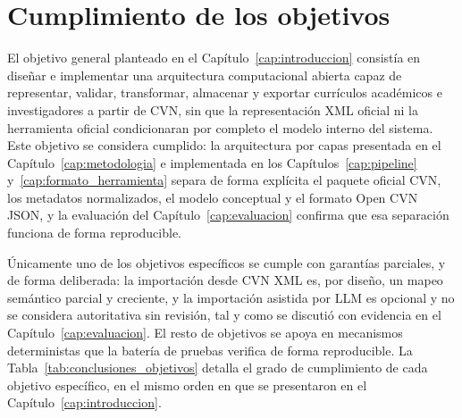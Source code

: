 \section{Cumplimiento de los objetivos}
\label{sec:conclusiones_objetivos}

El objetivo general planteado en el Capítulo~\ref{cap:introduccion} consistía
en diseñar e implementar una arquitectura computacional abierta capaz de
representar, validar, transformar, almacenar y exportar currículos
académicos e investigadores a partir de CVN, sin que la representación XML
oficial ni la herramienta oficial condicionaran por completo el modelo
interno del sistema. Este objetivo se considera cumplido: la arquitectura
por capas presentada en el Capítulo~\ref{cap:metodologia} e implementada en
los Capítulos~\ref{cap:pipeline} y~\ref{cap:formato_herramienta} separa de
forma explícita el paquete oficial CVN, los metadatos normalizados, el
modelo conceptual y el formato Open CVN JSON, y la evaluación del
Capítulo~\ref{cap:evaluacion} confirma que esa separación funciona de forma
reproducible.

Únicamente uno de los objetivos específicos se cumple con garantías
parciales, y de forma deliberada: la importación desde CVN XML es, por
diseño, un mapeo semántico parcial y creciente, y la importación asistida
por LLM es opcional y no se considera autoritativa sin revisión, tal y como
se discutió con evidencia en el Capítulo~\ref{cap:evaluacion}. El resto de
objetivos se apoya en mecanismos deterministas que la batería de pruebas
verifica de forma reproducible. La Tabla~\ref{tab:conclusiones_objetivos}
detalla el grado de cumplimiento de cada objetivo específico, en el mismo
orden en que se presentaron en el Capítulo~\ref{cap:introduccion}.

